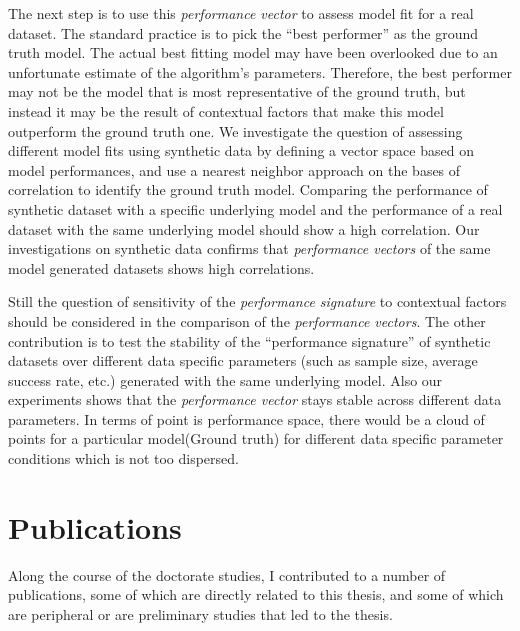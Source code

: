 The next step is to use this \textit{performance vector} to assess model fit for a real dataset. The standard practice is to pick the ``best performer'' as the ground truth model. The actual best fitting model may have been overlooked due to an unfortunate estimate of the algorithm's parameters. Therefore, the best performer may not be the model that is most representative of the ground truth, but instead it may be the result of contextual factors that make this model outperform the ground truth one. We investigate the question of assessing different model fits using synthetic data by defining a vector space based on model performances, and use a nearest neighbor approach on the bases of correlation to identify the ground truth model. Comparing the performance of synthetic dataset with a specific underlying model and the performance of a real dataset with the same underlying model should show a high correlation. Our investigations on synthetic data confirms that \textit{performance vectors} of the same model generated datasets shows high correlations. 

Still the question of sensitivity of the \textit{performance signature} to contextual factors should be considered in the comparison of the \textit{performance vectors}. The other contribution is to test the stability of the ``performance signature'' of synthetic datasets over different data specific parameters (such as sample size, average success rate, etc.) generated with the same underlying model. Also our experiments shows that the \textit{performance vector} stays stable across different data parameters. In terms of point is performance space, there would be a cloud of points for a particular model(Ground truth) for different data specific parameter conditions which is not too dispersed.


\section{Publications}

Along the course of the doctorate studies, I contributed to a number of publications, some of which are directly related to this thesis, and some of which are peripheral or are preliminary studies that led to the thesis.

